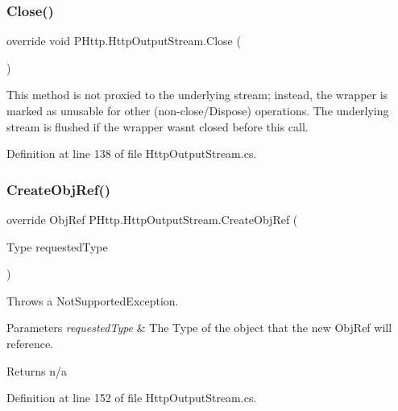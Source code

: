 \subsubsection{\texorpdfstring{Close()}{Close()}}
{\footnotesize\ttfamily override void P\+Http.\+Http\+Output\+Stream.\+Close (\begin{DoxyParamCaption}{ }\end{DoxyParamCaption})}



This method is not proxied to the underlying stream; instead, the wrapper is marked as unusable for other (non-\/close/\+Dispose) operations. The underlying stream is flushed if the wrapper wasn\textquotesingle{}t closed before this call. 



Definition at line 138 of file Http\+Output\+Stream.\+cs.

\mbox{\label{class_p_http_1_1_http_output_stream_affae8b4276a22a7a3cdd0ac6364c9abb}} 
\subsubsection{\texorpdfstring{Create\+Obj\+Ref()}{CreateObjRef()}}
{\footnotesize\ttfamily override Obj\+Ref P\+Http.\+Http\+Output\+Stream.\+Create\+Obj\+Ref (\begin{DoxyParamCaption}\item[{Type}]{requested\+Type }\end{DoxyParamCaption})}



Throws a Not\+Supported\+Exception. 


\begin{DoxyParams}{Parameters}
{\em requested\+Type} & The Type of the object that the new Obj\+Ref will reference.\\
\hline
\end{DoxyParams}
\begin{DoxyReturn}{Returns}
n/a
\end{DoxyReturn}


Definition at line 152 of file Http\+Output\+Stream.\+cs.

\mbox{\label{class_p_http_1_1_http_output_stream_a313ebbb0a9983abe53c62a9e92f7fc5e}} 
